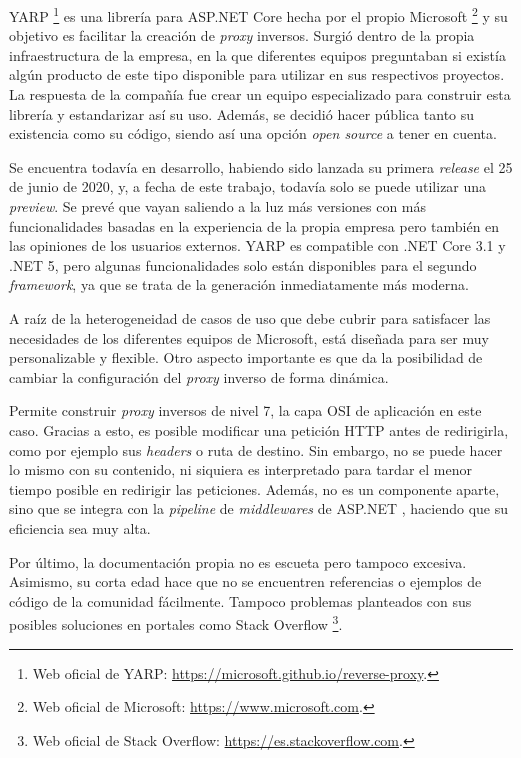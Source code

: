 \documentclass[11pt,spanish,listoffigures]{tfgetsinf}
\begin{document}
YARP \footnote{Web oficial de YARP: \url{https://microsoft.github.io/reverse-proxy}.} es una librería para ASP.NET Core hecha por el propio Microsoft \footnote{Web oficial de Microsoft: \url{https://www.microsoft.com}.} y su objetivo es facilitar la creación de \emph{proxy} inversos. Surgió dentro de la propia infraestructura de la empresa, en la que diferentes equipos preguntaban si existía algún producto de este tipo disponible para utilizar en sus respectivos proyectos. La respuesta de la compañía fue crear un equipo especializado para construir esta librería y estandarizar así su uso. Además, se decidió hacer pública tanto su existencia como su código, siendo así una opción \emph{open source} a tener en cuenta.

Se encuentra todavía en desarrollo, habiendo sido lanzada su primera \emph{release} el 25 de junio de 2020, y, a fecha de este trabajo, todavía solo se puede utilizar una \emph{preview}. Se prevé que vayan saliendo a la luz más versiones con más funcionalidades basadas en la experiencia de la propia empresa pero también en las opiniones de los usuarios externos. YARP es compatible con .NET Core 3.1 y .NET 5, pero algunas funcionalidades solo están disponibles para el segundo \emph{framework}, ya que se trata de la generación inmediatamente más moderna.

A raíz de la heterogeneidad de casos de uso que debe cubrir para satisfacer las necesidades de los diferentes equipos de Microsoft, está diseñada para ser muy personalizable y flexible. Otro aspecto importante es que da la posibilidad de cambiar la configuración del \emph{proxy} inverso de forma dinámica.

Permite construir \emph{proxy} inversos de nivel 7, la capa OSI de aplicación en este caso. Gracias a esto, es posible modificar una petición HTTP antes de redirigirla, como por ejemplo sus \emph{headers} o ruta de destino. Sin embargo, no se puede hacer lo mismo con su contenido, ni siquiera es interpretado para tardar el menor tiempo posible en redirigir las peticiones. Además, no es un componente aparte, sino que se integra con la \emph{pipeline} de \emph{middlewares} de ASP.NET \cite{MiddlewaresPipeline}, haciendo que su eficiencia sea muy alta.

Por último, la documentación propia \cite{YARP} no es escueta pero tampoco excesiva. Asimismo, su corta edad hace que no se encuentren referencias o ejemplos de código de la comunidad fácilmente. Tampoco problemas planteados con sus posibles soluciones en portales como Stack Overflow \footnote{Web oficial de Stack Overflow: \url{https://es.stackoverflow.com}.}.
\end{document}
